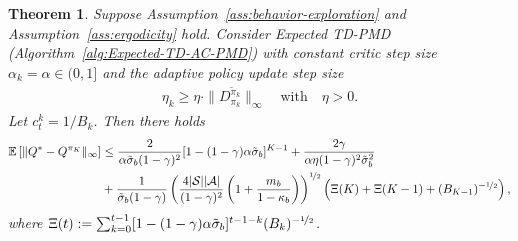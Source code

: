 \documentclass[10pt]{article}
\newcommand{\calA}{\mathcal{A}}
\newcommand{\calS}{\mathcal{S}}
\newcommand{\E}{\mathbb{E}}
\newcommand{\ls}{\left}
\newcommand{\rs}{\right}
\theoremstyle{plain}
\newtheorem{theorem}{Theorem}[section]
\theoremstyle{definition}
\begin{document}
\begin{theorem}
    Suppose Assumption~\ref{ass:behavior-exploration} and Assumption~\ref{ass:ergodicity} hold. Consider Expected TD-PMD \textup{(}Algorithm~\ref{alg:Expected-TD-AC-PMD}\textup{)} with constant critic step size $\alpha_k = \alpha \in (0,1]$ and the adaptive policy update step size
    \begin{align*}
        \eta_k \geq \eta \cdot \| D^{\tilde\pi_k}_{\pi_k} \|_\infty \quad \mbox{with} \quad \eta > 0.
    \end{align*}
    Let $c_t^k=1/B_k$. Then there holds
    \begin{align*}
        \E\ls[ \| Q^* - Q^{\pi_K} \|_\infty \rs] &\leq \frac{2}{\alpha\tilde\sigma_b(1-\gamma)^2} [1-(1-\gamma)\alpha\tilde\sigma_b]^{K-1} + \frac{2\gamma}{\alpha\eta(1-\gamma)^2 \tilde\sigma_b^2} \\
        &+ \frac{1}{\tilde\sigma_b(1-\gamma)} \ls( \frac{4|\calS||\calA|}{(1-\gamma)^2} \ls( 1+\frac{m_b}{1-\kappa_b} \rs) \rs)^{\nicefrac{1}{2}} \ls( \Xi(K) + \Xi(K-1) + (B_{K-1})^{-\nicefrac{1}{2}} \rs),
    \end{align*}
    where $\Xi(t) := \sum_{k=0}^{t-1} [1-(1-\gamma)\alpha\tilde\sigma_b]^{t-1-k} (B_k)^{-\nicefrac{1}{2}}$.
    \label{thm:Expected-TD-AC-PMD:adaptive-step-size}
\end{theorem}
\end{document}
